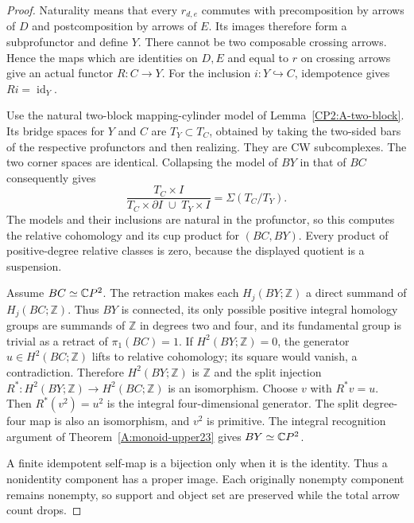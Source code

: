 \begin{proof}
Naturality means that every $r_{d,e}$ commutes with precomposition
by arrows of $D$ and postcomposition by arrows of $E$. Its images
therefore form a subprofunctor and define $Y$. There cannot be two
composable crossing arrows. Hence the maps which are identities
on $D,E$ and equal to $r$ on crossing arrows give an actual functor
$R:C\to Y$. For the inclusion $i:Y\hookrightarrow C$, idempotence
gives $Ri=\operatorname{id}_Y$.

Use the natural two-block mapping-cylinder model of
Lemma~\ref{CP2:A-two-block}. Its bridge spaces for $Y$ and $C$ are
$T_Y\subset T_C$, obtained by taking the two-sided bars of the
respective profunctors and then realizing. They are CW subcomplexes.
The two corner spaces are identical. Collapsing the model of $BY$
in that of $BC$ consequently gives
\[
 \frac{T_C\times I}
 {T_C\times\partial I\;\cup\;T_Y\times I}
   =\Sigma(T_C/T_Y).
\]
The models and their inclusions are natural in the profunctor, so
this computes the relative cohomology and its cup product for
$(BC,BY)$. Every product of positive-degree relative classes is
zero, because the displayed quotient is a suspension.

Assume $BC\simeq\mathbb{C}P^2$. The retraction makes each
$H_j(BY;\mathbb Z)$ a direct summand of $H_j(BC;\mathbb Z)$.
Thus $BY$ is connected, its only possible positive integral
homology groups are summands of $\mathbb Z$ in degrees two and
four, and its fundamental group is trivial as a retract of
$\pi_1(BC)=1$. If $H^2(BY;\mathbb Z)=0$, the generator
$u\in H^2(BC;\mathbb Z)$ lifts to relative cohomology; its square
would vanish, a contradiction. Therefore $H^2(BY;\mathbb Z)$ is
$\mathbb Z$ and the split injection
$R^*:H^2(BY;\mathbb Z)\to H^2(BC;\mathbb Z)$ is an isomorphism.
Choose $v$ with $R^*v=u$. Then $R^*(v^2)=u^2$ is the integral
four-dimensional generator. The split degree-four map is also
an isomorphism, and $v^2$ is primitive. The integral recognition
argument of Theorem~\ref{A:monoid-upper23} gives $BY\simeq\mathbb{C}P^2$.

A finite idempotent self-map is a bijection only when it is the
identity. Thus a nonidentity component has a proper image.
Each originally nonempty component remains nonempty, so support
and object set are preserved while the total arrow count drops.
\end{proof}

